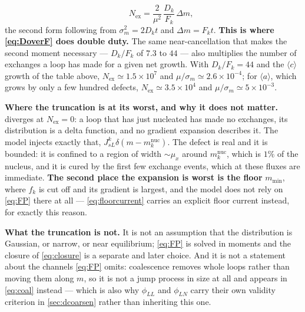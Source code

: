 \documentclass{article}
\newcommand{\aloop}{\ensuremath{\langle a\rangle}}
\newcommand{\cloop}{\ensuremath{\langle c\rangle}}
\begin{document}
\begin{enumerate}
\begin{equation}
        \qquad
        N_{\mathrm{ex}}=\frac{2}{\mu^{2}}\,\frac{D_k}{F_k}\,\Delta m ,
        \label{eq:Nex}
      \end{equation}
      the second form following from $\sigma_m^{2}=2D_kt$ and $\Delta m=F_kt$.
      \textbf{This is where \cref{eq:DoverF} does double duty.} The same
      near-cancellation that makes the second moment necessary --- $D_k/F_k$ of
      $7.3$ to $44$ --- also multiplies the number of exchanges a loop has made
      for a given net growth. With $D_k/F_k=44$ and the \cloop{} growth of the
      table above, $N_{\mathrm{ex}}\simeq1.5\times10^{7}$ and
      $\mu/\sigma_m\simeq2.6\times10^{-4}$; for \aloop{}, which grows by only a
      few hundred defects, $N_{\mathrm{ex}}\simeq3.5\times10^{4}$ and
      $\mu/\sigma_m\simeq5\times10^{-3}$.
\end{enumerate}

\textbf{Where the truncation is at its worst, and why it does not matter.}
 diverges at $N_{\mathrm{ex}}=0$: a loop that has just nucleated has
made no exchanges, its distribution is a delta function, and no gradient
expansion describes it. The model injects exactly that, $J^k_{sL}\delta(m-
m^{\mathrm{nuc}}_k)$. The defect is real and it is bounded: it is confined to a
region of width $\sim\mu_x$ around $m^{\mathrm{nuc}}_k$, which is $1\%$ of the
nucleus, and it is cured by the first few exchange events, which at these fluxes
are immediate. \textbf{The second place the expansion is worst is the floor}
$m_{\min}$, where $f_k$ is cut off and its gradient is largest, and the model
does not rely on \cref{eq:FP} there at all --- \cref{eq:floorcurrent} carries an
explicit floor current instead, for exactly this reason.

\textbf{What the truncation is not.} It is not an assumption that the
distribution is Gaussian, or narrow, or near equilibrium; \cref{eq:FP} is solved
in moments and the closure of \cref{eq:closure} is a separate and later choice.
And it is not a statement about the channels \cref{eq:FP} omits: coalescence
removes whole loops rather than moving them along $m$, so it is not a jump
process in size at all and appears in \cref{eq:coal} instead --- which is also
why $\phi_{LL}$ and $\phi_{LN}$ carry their own validity criterion in
\cref{sec:dcoarsen} rather than inheriting this one.
\end{document}
